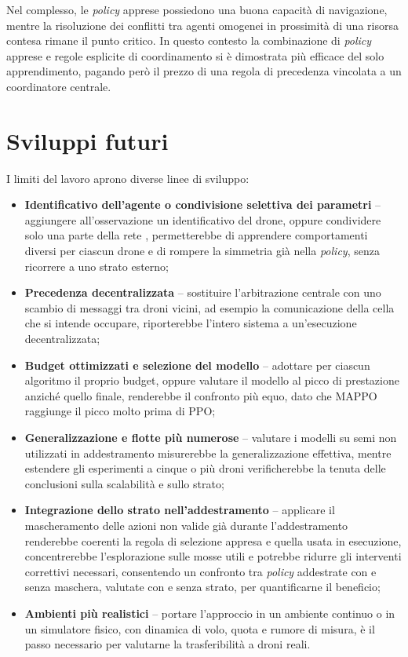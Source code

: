 \documentclass[12pt,a4paper,twoside]{report}
\newcommand{\parencite}[1]{\citep{#1}}
\begin{document}
Nel complesso, le \emph{policy} apprese possiedono una buona capacità di navigazione, mentre la risoluzione dei conflitti tra agenti omogenei in prossimità di una risorsa contesa rimane il punto critico. In questo contesto la combinazione di \emph{policy} apprese e regole esplicite di coordinamento si è dimostrata più efficace del solo apprendimento, pagando però il prezzo di una regola di precedenza vincolata a un coordinatore centrale.
\newpage
\section{Sviluppi futuri}
\label{sec:sviluppi_futuri}

I limiti del lavoro aprono diverse linee di sviluppo:
\begin{itemize}
    \item \textbf{Identificativo dell'agente o condivisione selettiva dei parametri} -- aggiungere all'osservazione un identificativo del drone, oppure condividere solo una parte della rete \parencite{christianos2021}, permetterebbe di apprendere comportamenti diversi per ciascun drone e di rompere la simmetria già nella \emph{policy}, senza ricorrere a uno strato esterno;
   \item \textbf{Precedenza decentralizzata} -- sostituire l'arbitrazione centrale con uno scambio di messaggi tra droni vicini, ad esempio la comunicazione della cella che si intende occupare, riporterebbe l'intero sistema a un'esecuzione decentralizzata;
    \item \textbf{Budget ottimizzati e selezione del modello} -- adottare per ciascun algoritmo il proprio budget, oppure valutare il modello al picco di prestazione anziché quello finale, renderebbe il confronto più equo, dato che MAPPO raggiunge il picco molto prima di PPO;
    \item \textbf{Generalizzazione e flotte più numerose} -- valutare i modelli su semi non utilizzati in addestramento misurerebbe la generalizzazione effettiva, mentre estendere gli esperimenti a cinque o più droni verificherebbe la tenuta delle conclusioni sulla scalabilità e sullo strato;
    \item \textbf{Integrazione dello strato nell'addestramento} -- applicare il mascheramento delle azioni non valide già durante l'addestramento \parencite{huang2022} renderebbe coerenti la regola di selezione appresa e quella usata in esecuzione, concentrerebbe l'esplorazione sulle mosse utili e potrebbe ridurre gli interventi correttivi necessari, consentendo un confronto tra \emph{policy} addestrate con e senza maschera, valutate con e senza strato, per quantificarne il beneficio;
    \item \textbf{Ambienti più realistici} -- portare l'approccio in un ambiente continuo o in un simulatore fisico, con dinamica di volo, quota e rumore di misura, è il passo necessario per valutarne la trasferibilità a droni reali.
\end{itemize}
\end{document}
